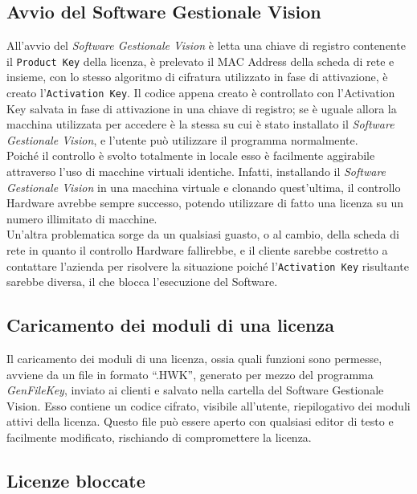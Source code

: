 \subsection{Avvio del Software Gestionale Vision} 

All'avvio del \textit{Software Gestionale Vision} è letta una chiave di registro contenente il \texttt{Product Key} della licenza, è prelevato il MAC Address della scheda di rete e insieme, con lo stesso algoritmo di cifratura utilizzato in fase di attivazione, è creato l'\texttt{Activation Key}. Il codice appena creato è controllato con l’Activation Key salvata in fase di attivazione in una chiave di registro; se è uguale allora la macchina utilizzata per accedere è la stessa su cui è stato installato il \textit{Software Gestionale Vision}, e l’utente può utilizzare il programma normalmente.\\
Poiché il controllo è svolto totalmente in locale esso è facilmente aggirabile attraverso l’uso di macchine virtuali identiche. Infatti, installando il \textit{Software Gestionale Vision} in una macchina virtuale e clonando quest'ultima, il controllo Hardware avrebbe sempre successo, potendo utilizzare di fatto una licenza su un numero illimitato di macchine. 
\\Un'altra problematica sorge da un qualsiasi guasto, o al cambio, della scheda di rete in quanto il controllo Hardware fallirebbe, e il cliente sarebbe costretto a contattare l’azienda per risolvere la situazione poiché l'\texttt{Activation Key} risultante sarebbe diversa, il che blocca l'esecuzione del Software.

\subsection{Caricamento dei moduli di una licenza} 
Il caricamento dei moduli di una licenza, ossia quali funzioni sono permesse, avviene da un file in formato “.HWK”, generato per mezzo del 
programma \textit{GenFileKey}, inviato ai clienti e salvato nella cartella del Software Gestionale Vision. Esso contiene un codice cifrato, visibile all’utente, riepilogativo dei moduli attivi della licenza. Questo file può essere aperto con qualsiasi editor di testo e facilmente modificato, rischiando di compromettere la licenza.

\subsection{Licenze bloccate} 

